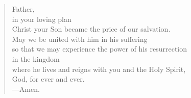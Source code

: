 \prayer

\setlength{\leftmargini}{\prayerleftmargini}

\begin{verse}
Father,\\
in your loving plan\\
Christ your Son became the price of our salvation.\\
May we be united with him in his suffering\\
so that we may experience the power of his resurrection\\
in the kingdom\\
where he lives and reigns with you and the Holy Spirit,\\
God, for ever and ever.\\
{\color{red}---\thinspace}Amen.
\end{verse}

\setlength{\leftmargini}{\defleftmargini}
